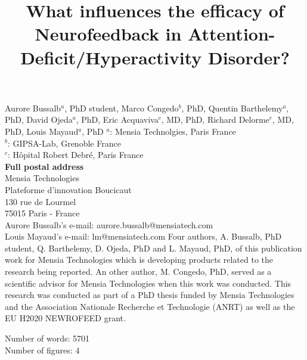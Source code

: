 

\title{What influences the efficacy of Neurofeedback in Attention-Deficit/Hyperactivity Disorder?} %
\maketitle
\noindent Aurore Bussalb$^a$, PhD student, Marco Congedo$^b$, PhD, Quentin Barthelemy$^a$, PhD, David Ojeda$^a$, PhD, 
Eric Acquaviva$^c$, MD, PhD, Richard Delorme$^c$, MD, PhD, Louis Mayaud$^a$, PhD 
\smallbreak
\noindent $^a$: Mensia Technolgies, Paris France \\
\noindent $^b$: GIPSA-Lab, Grenoble France \\
\noindent $^c$: Hôpital Robert Debré, Paris France \\ 
\smallbreak
\noindent\textbf{Full postal address} \\
Mensia Technologies \\
Plateforme d'innovation Boucicaut \\
130 rue de Lourmel \\
75015 Paris - France \\
Aurore Bussalb's e-mail: aurore.bussalb@mensiatech.com \\
Louis Mayaud's e-mail: lm@mensiatech.com 
\smallbreak
Four authors, A. Bussalb, PhD student, Q. Barthelemy, D. Ojeda, PhD and L. Mayaud, PhD, of this publication 
work for Mensia Technologies which is developing products related to the research being reported.
An other author, M. Congedo, PhD, served as a scientific advisor for Mensia Technologies when this work was conducted. 
\smallbreak
This research was conducted as part of a PhD thesis funded by Mensia Technologies and the Association Nationale 
Recherche et Technologie (ANRT) as well as the EU H2020 NEWROFEED grant.

Number of words: 5701 \\
Number of figures: 4 
